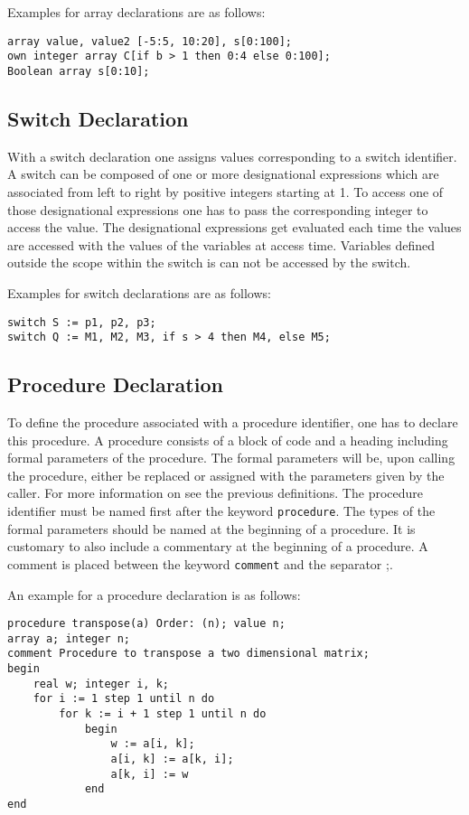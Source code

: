 \documentclass{article}
\begin{document}
Examples for array declarations are as follows:\\ 
\begin{lstlisting}[language={[60]algol}]
array value, value2 [-5:5, 10:20], s[0:100];
own integer array C[if b > 1 then 0:4 else 0:100];
Boolean array s[0:10];
\end{lstlisting}

\subsection{Switch Declaration} \label{switchDecl}
With a switch declaration one assigns values corresponding to a switch identifier. A switch can be composed of one or more designational expressions which are associated from left to right by positive integers starting at 1. To access one of those designational expressions one has to pass the corresponding integer to access the value. The designational expressions get evaluated each time the values are accessed with the values of the variables at access time. Variables defined outside the scope within the switch is can not be accessed by the switch.

Examples for switch declarations are as follows:\\ 
\begin{lstlisting}[language={[60]algol}]
switch S := p1, p2, p3;
switch Q := M1, M2, M3, if s > 4 then M4, else M5;
\end{lstlisting}

\subsection{Procedure Declaration} \label{procDecl}
To define the procedure associated with a procedure identifier, one has to declare this procedure. A procedure consists of a block of code and a heading including formal parameters of the procedure. The formal parameters will be, upon calling the procedure, either be replaced or assigned with the parameters given by the caller. For more information on  see the previous definitions. The procedure identifier must be named first after the keyword \texttt{procedure}. The types of the formal parameters should be named at the beginning of a procedure. It is customary to also include a commentary at the beginning of a procedure. A comment is placed between the keyword \texttt{comment} and the separator ;.

An example for a procedure declaration is as follows:\\ 
\begin{lstlisting}[language={[60]algol}]
procedure transpose(a) Order: (n); value n;
array a; integer n;
comment Procedure to transpose a two dimensional matrix;
begin
    real w; integer i, k;
    for i := 1 step 1 until n do
        for k := i + 1 step 1 until n do
            begin
                w := a[i, k];
                a[i, k] := a[k, i];
                a[k, i] := w
            end
end
\end{lstlisting}
\end{document}
